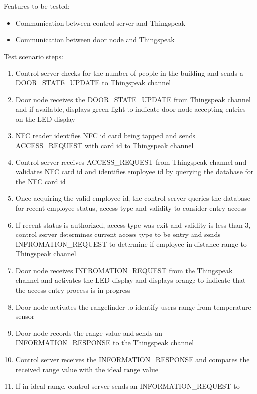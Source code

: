 \noindent
Features to be tested:
\begin{itemize}
    \item Communication between control server and Thingspeak
    \item Communication between door node and Thingspeak
\end{itemize}

\noindent
Test scenario steps:
\begin{enumerate}
    \item Control server checks for the number of people in the building and
          sends a DOOR\_STATE\_UPDATE to Thingspeak channel
    \item Door node receives the DOOR\_STATE\_UPDATE from Thingspeak channel and
          if available, displays green light to indicate door node accepting
          entries on the LED display
    \item NFC reader identifies NFC id card being tapped and sends
          ACCESS\_REQUEST with card id to Thingspeak channel
    \item Control server receives ACCESS\_REQUEST from Thingspeak channel and
          validates NFC card id and identifies employee id by querying the
          database for the NFC card id 
    \item Once acquiring the valid employee id, the control server queries the
          database for recent employee status, access type and validity to
          consider entry access
    \item If recent status is authorized, access type was exit and validity is
          less than 3, control server determines current access type to be entry
          and sends INFROMATION\_REQUEST to determine if employee in distance
          range to Thingspeak channel
    \item Door node receives INFROMATION\_REQUEST from the Thingspeak channel
          and activates the LED display and displays orange to indicate that the
          access entry process is in progress 
    \item Door node activates the rangefinder to identify users range from
          temperature sensor
    \item Door node records the range value and sends an INFORMATION\_RESPONSE
          to the Thingspeak channel
    \item Control server receives the INFORMATION\_RESPONSE and compares the
          received range value with the ideal range value
    \item If in ideal range, control server sends an INFORMATION\_REQUEST to

\end{enumerate}
